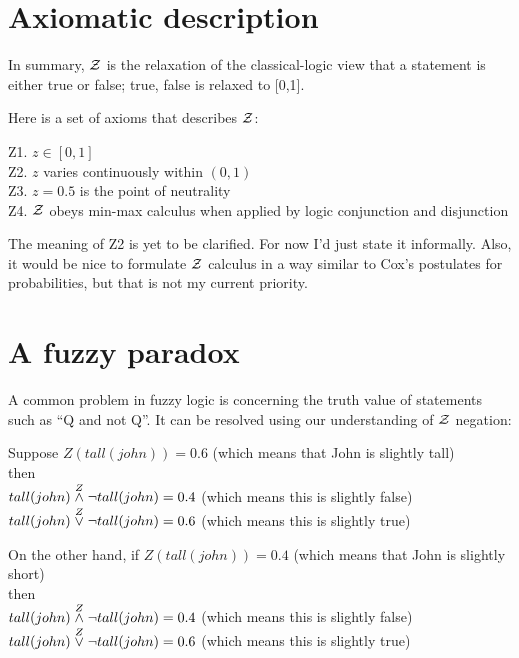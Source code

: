 \section{Axiomatic description}
\label{sec:fuzziness-axioms}

In summary, $\mathcal{Z}$ is the relaxation of the classical-logic view that a statement is either true or false;  {true, false} is relaxed to [0,1].

Here is a set of axioms that describes $\mathcal{Z}$:

Z1. $z \in [0,1]$ \\
Z2. $z$ varies continuously within $(0,1)$ \\
Z3. $z=0.5$ is the point of neutrality\\
Z4. $\mathcal{Z}$ obeys min-max calculus when applied by logic conjunction and disjunction

The meaning of Z2 is yet to be clarified.  For now I'd just state it informally.  Also, it would be nice to formulate $\mathcal{Z}$ calculus in a way similar to Cox's postulates for probabilities, but that is not my current priority.

\section{A fuzzy paradox}

A common problem in fuzzy logic is concerning the truth value of statements such as ``Q and not Q''.  It can be resolved using our understanding of $\mathcal{Z}$ negation:

Suppose $Z(tall(john)) = 0.6$ (which means that John is slightly tall)\\
then\\
\hspace*{1cm} $ tall(john) \stackrel{Z}{\wedge} \neg tall(john) = 0.4$ (which means this is slightly false)\\
\hspace*{1cm} $ tall(john) \stackrel{Z}{\vee} \neg tall(john) = 0.6$ (which means this is slightly true)

On the other hand, if $Z(tall(john)) = 0.4$ (which means that John is slightly short)\\
then\\
\hspace*{1cm} $ tall(john) \stackrel{Z}{\wedge} \neg tall(john) = 0.4$ (which means this is slightly false)\\
\hspace*{1cm} $ tall(john) \stackrel{Z}{\vee} \neg tall(john) = 0.6$ (which means this is slightly true)

